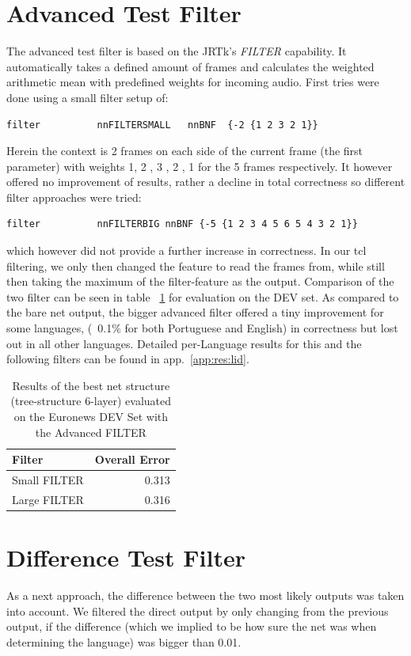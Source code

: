 \section{Advanced Test Filter}
\label{sec:eval:advanced}
The advanced test filter is based on the JRTk's \textit{FILTER} capability. It automatically takes a defined amount of frames and calculates the weighted arithmetic mean with predefined weights for incoming audio. First tries were done using a small filter setup of:
\begin{verbatim}
filter          nnFILTERSMALL   nnBNF  {-2 {1 2 3 2 1}}
\end{verbatim}  Herein the context is 2 frames on each side of the current frame (the first parameter) with weights 1, 2 , 3 , 2 , 1 for the 5 frames respectively.  It however offered no improvement of results, rather a decline in total correctness so different filter approaches were tried:
\begin{verbatim}
filter          nnFILTERBIG nnBNF {-5 {1 2 3 4 5 6 5 4 3 2 1}}
\end{verbatim}
which however did not provide a further increase in correctness. In our tcl filtering, we only then changed the feature to read the frames from, while still then taking the maximum of the filter-feature as the output. Comparison of the two filter can be seen  in table ~\ref{tab:evalAdvanced} for evaluation on the DEV set. As compared to the bare net output, the bigger advanced filter offered a tiny improvement for some languages, (~0.1\% for both Portuguese and English) in correctness but lost out in all other languages. Detailed per-Language results for this and the following filters can be found in app.~\ref{app:res:lid}.

\begin{table}[h!]
\centering
\caption{Results of the best net structure (tree-structure 6-layer) evaluated on the Euronews DEV Set with the Advanced FILTER}
\label{tab:evalAdvanced}
\begin{tabular}{| l | r |}
	\hline
	\textbf{Filter} & \textbf{Overall Error}  \\
	\hline
	Small FILTER  &  0.313 \\
	\hline
	Large FILTER & 0.316 \\
	\hline
\end{tabular}
\end{table}


\section{Difference Test Filter}
\label{sec:eval:variance}
As a next approach, the difference between the two most likely outputs was taken into account. We filtered the direct output by only changing from the previous output, if the difference (which we implied to be how sure the net was when determining the language) was bigger than 0.01. 

